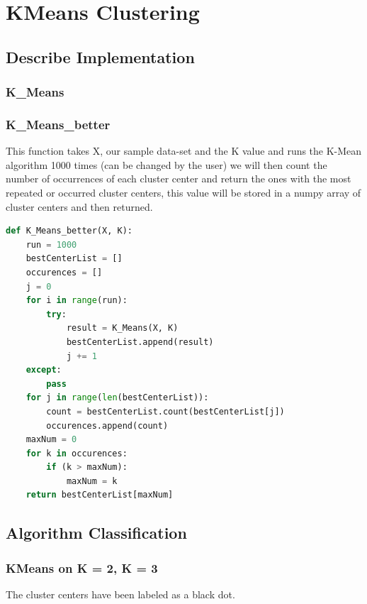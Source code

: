 \documentclass{article}
\begin{document}
	\section{KMeans Clustering}
	\subsection{Describe Implementation}
	
	\subsubsection{K\_Means}
	\subsubsection{K\_Means\_better}
	This function takes X, our sample data-set and the K value and runs the K-Mean algorithm 1000 times (can be changed by the user) we will then count the number of occurrences of each cluster center and return the ones with the most repeated or occurred cluster centers, this value will be stored in a numpy array of cluster centers and then returned.
	\begin{lstlisting}[language=Python]
	def K_Means_better(X, K):
	run = 1000
	bestCenterList = []
	occurences = []
	j = 0
	for i in range(run):
		try:
			result = K_Means(X, K)
			bestCenterList.append(result)
			j += 1
	except:
		pass
	for j in range(len(bestCenterList)):
		count = bestCenterList.count(bestCenterList[j])
		occurences.append(count)
	maxNum = 0
	for k in occurences:
		if (k > maxNum):
			maxNum = k
	return bestCenterList[maxNum]
	\end{lstlisting}
	\subsection{Algorithm Classification}
	\subsubsection{KMeans on K = 2, K = 3}
	The cluster centers have been labeled as a black dot. \\
	
\end{document}
